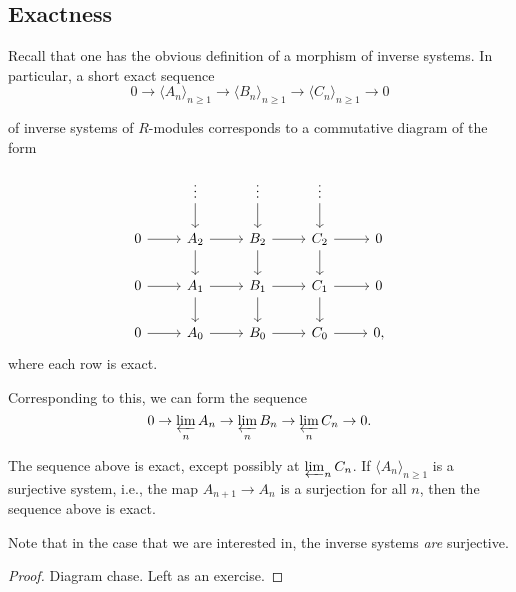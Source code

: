 \documentclass[12pt]{article}
\begin{document}
\subsection{Exactness}

Recall that one has the obvious definition of a morphism of inverse systems. In particular, a short exact sequence 
\begin{equation*} 
	0 \to \langle A_{n} \rangle_{n \ge 1} \to \langle B_{n} \rangle_{n \ge 1} \to \langle C_{n} \rangle_{n \ge 1} \to 0
\end{equation*} 

of inverse systems of $R$-modules corresponds to a commutative diagram of the form

\begin{equation*} 
	\begin{tikzcd}
		& \vdots \arrow[d] & \vdots \arrow[d] & \vdots \arrow[d] & \\
		0 \arrow[r] & A_{2} \arrow[d] \arrow[r] & B_{2} \arrow[d] \arrow[r] & C_{2} \arrow[d] \arrow[r] & 0 \\
		0 \arrow[r] & A_{1} \arrow[d] \arrow[r] & B_{1} \arrow[d] \arrow[r] & C_{1} \arrow[d] \arrow[r] & 0 \\
		0 \arrow[r] & A_{0} \arrow[r] & B_{0} \arrow[r] & C_{0} \arrow[r] & 0, 
	\end{tikzcd}
\end{equation*}
where each row is exact.

Corresponding to this, we can form the sequence
\begin{equation*} 
	0 \to \varprojlim_{n} A_{n} \to \varprojlim_{n} B_{n} \to \varprojlim_{n} C_{n} \to 0.
\end{equation*}

\begin{prop}
	The sequence above is exact, except possibly at $\varprojlim_{n} C_{n}$. \newline
	If $\langle A_{n} \rangle_{n \ge 1}$ is a surjective system, i.e., the map $A_{n + 1} \to A_{n}$ is a surjection for all $n$, then the sequence above is exact.
\end{prop}

Note that in the case that we are interested in, the inverse systems \emph{are} surjective. 

\begin{proof} 
	Diagram chase. Left as an exercise.
\end{proof}
\end{document}
